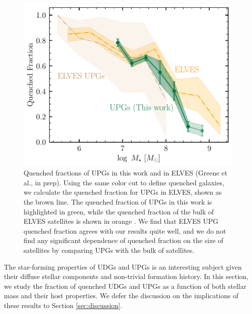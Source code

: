 \documentclass[twocolumn,astrosymb,twocolappendix]{aastex631}
\begin{document}
\begin{CJK*}{UTF8}{gbsn}
\begin{figure}
    \centering
    \includegraphics[width=1\linewidth]{quenched_frac_elves.pdf}
    \caption{Quenched fractions of UPGs in this work and in ELVES (Greene et al., in prep). Using the same color cut to define quenched galaxies, we calculate the quenched fraction for UPGs in ELVES, shown as the brown line. The quenched fraction of UPGs in this work is highlighted in green, while the quenched fraction of the bulk of ELVES satellites is shown in orange \citep{CarlstenELVES2022}. We find that ELVES UPG quenched fraction agrees with our results quite well, and we do not find any significant dependence of quenched fraction on the size of satellites by comparing UPGs with the bulk of satellites. 
    }
    \label{fig:qfrac_upg_elves}
\end{figure}

The star-forming properties of UDGs and UPGs is an interesting subject given their diffuse stellar components and non-trivial formation history. In this section, we study the fraction of quenched UDGs and UPGs as a function of both stellar mass and their host properties. We defer the discussion on the implications of these results to Section \ref{sec:discussion}.


\end{CJK*}
\end{document}
